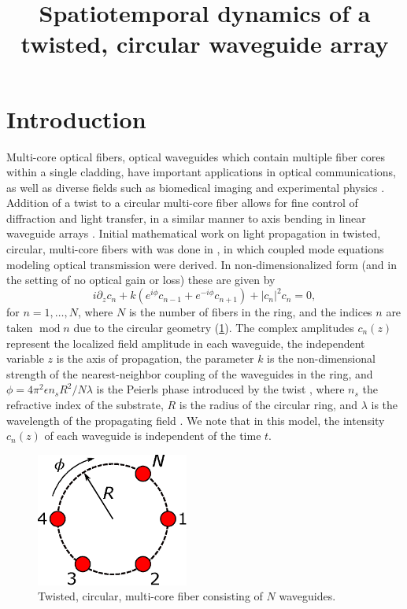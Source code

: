\documentclass[11pt,reqno]{amsart}
\title{Spatiotemporal dynamics of a twisted, circular waveguide array}
\DeclareMathOperator{\md}{mod}
\begin{document}
\maketitle

\section{Introduction}

Multi-core optical fibers, optical waveguides which contain multiple fiber  cores within a single cladding, have important applications in optical communications, as well as diverse fields such as biomedical imaging and experimental physics \cite{Ortiz2018}. Addition of a twist to a circular multi-core fiber allows for fine control of diffraction and light transfer, in a similar manner to axis bending in linear waveguide arrays \cite{Longhi2005}. Initial mathematical work on light propagation in twisted, circular, multi-core fibers with was done in \cite{Longhi2007,Longhi2007b,Garanovich2012}, in which coupled mode equations modeling optical transmission were derived. In non-dimensionalized form (and in the setting of no optical gain or loss) these are given by
\begin{equation}\label{eq:coupledmode}
i \partial_z c_n + k \left(e^{i\phi}c_{n-1} + e^{-i\phi}c_{n+1} \right) + |c_n|^2 c_n = 0,
\end{equation}
for $n = 1, \dots, N$, where $N$ is the number of fibers in the ring, and the indices $n$ are taken $\md n$ due to the circular geometry (\cref{fig:circle}). The complex amplitudes $c_n(z)$ represent the localized field amplitude in each waveguide, the independent variable $z$ is the axis of propagation, the parameter $k$ is the non-dimensional strength of the nearest-neighbor coupling of the waveguides in the ring, and $\phi = 4 \pi^2 \epsilon n_s R^2/N \lambda$ is the Peierls phase introduced by the twist \cite{Longhi2007,Peierls1933}, where $n_s$ the refractive index of the substrate, $R$ is the radius of the circular ring, and $\lambda$ is the wavelength of the propagating field \cite{castro2016}. We note that in this model, the intensity $c_n(z)$ of each waveguide is independent of the time $t$.

\begin{figure}
\begin{center}
\includegraphics[width=5cm]{circle}
\end{center}
\caption{Twisted, circular, multi-core fiber consisting of $N$ waveguides.}
\label{fig:circle}
\end{figure}
\end{document}
